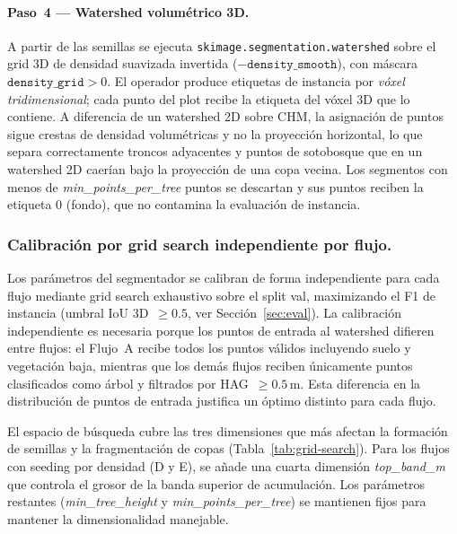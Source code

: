 \documentclass[runningheads]{llncs}
\begin{document}
\paragraph{Paso~4 --- Watershed volum\'etrico 3D.} A partir de las semillas se ejecuta \texttt{skimage.segmentation.watershed} sobre el grid 3D de densidad suavizada invertida ($-\texttt{density\_smooth}$), con m\'ascara $\texttt{density\_grid} > 0$. El operador produce etiquetas de instancia por \emph{v\'oxel tridimensional}; cada punto del plot recibe la etiqueta del v\'oxel 3D que lo contiene. A diferencia de un watershed 2D sobre CHM, la asignaci\'on de puntos sigue crestas de densidad volum\'etricas y no la proyecci\'on horizontal, lo que separa correctamente troncos adyacentes y puntos de sotobosque que en un watershed 2D caer\'ian bajo la proyecci\'on de una copa vecina. Los segmentos con menos de \emph{min\_points\_per\_tree} puntos se descartan y sus puntos reciben la etiqueta 0 (fondo), que no contamina la evaluaci\'on de instancia.

\subsubsection{Calibraci\'on por grid search independiente por flujo.}
Los par\'ametros del segmentador se calibran de forma independiente para cada flujo mediante grid search exhaustivo sobre el split val, maximizando el F1 de instancia (umbral IoU 3D~$\geq 0.5$, ver Secci\'on~\ref{sec:eval}). La calibraci\'on independiente es necesaria porque los puntos de entrada al watershed difieren entre flujos: el Flujo~A recibe todos los puntos v\'alidos incluyendo suelo y vegetaci\'on baja, mientras que los dem\'as flujos reciben \'unicamente puntos clasificados como \'arbol y filtrados por HAG~$\geq 0.5$\,m. Esta diferencia en la distribuci\'on de puntos de entrada justifica un \'optimo distinto para cada flujo.

El espacio de b\'usqueda cubre las tres dimensiones que m\'as afectan la formaci\'on de semillas y la fragmentaci\'on de copas (Tabla~\ref{tab:grid-search}). Para los flujos con seeding por densidad (D y E), se a\~nade una cuarta dimensi\'on \emph{top\_band\_m} que controla el grosor de la banda superior de acumulaci\'on. Los par\'ametros restantes (\emph{min\_tree\_height} y \emph{min\_points\_per\_tree}) se mantienen fijos para mantener la dimensionalidad manejable.
\end{document}
